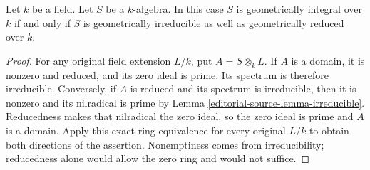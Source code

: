 \begin{lemma}
\label{editorial-source-lemma-geometrically-integral}
Let $k$ be a field.
Let $S$ be a $k$-algebra.
In this case $S$ is geometrically integral over $k$ if and only if
$S$ is geometrically irreducible as well as geometrically reduced over $k$.
\end{lemma}

\begin{proof}
For any original field extension $L/k$,
put $A=S\otimes_k L$. If $A$ is
a domain, it is nonzero and reduced,
and its zero ideal is prime. Its
spectrum is therefore irreducible.
Conversely, if $A$ is reduced and
its spectrum is irreducible, then
it is nonzero and its nilradical
is prime by Lemma \ref{editorial-source-lemma-irreducible}.
Reducedness makes that nilradical
the zero ideal, so the zero ideal
is prime and $A$ is a domain.
Apply this exact ring equivalence
for every original $L/k$ to obtain
both directions of the assertion.
Nonemptiness comes from irreducibility;
reducedness alone would allow the
zero ring and would not suffice.
\end{proof}